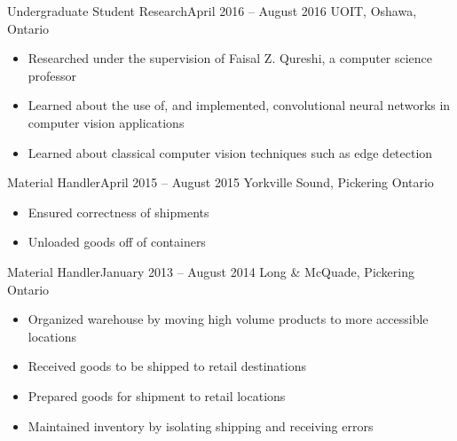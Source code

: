 \documentclass[]{article}
\makeatletter
\newenvironment{*subsection}[2]
{
\begin{tabu} to \linewidth {@{}X[l] r}
  \textbf{#1} &
  \textbf{#2}
\end{tabu}
}
{
  \vspace{3mm}
}
\makeatother
\begin{document}
%
\begin{*subsection}{Undergraduate Student Research}{April 2016 -- August 2016}
%
UOIT, Oshawa, Ontario
%
\begin{itemize}
\item
  Researched under the supervision of Faisal Z. Qureshi, a computer
  science professor
\item
  Learned about the use of, and implemented, convolutional neural networks in computer
  vision applications
\item
  Learned about classical computer vision techniques such as edge detection
\end{itemize}
\end{*subsection}
\begin{*subsection}{Material Handler}{April 2015 -- August 2015}
%
Yorkville Sound, Pickering Ontario
%
\begin{itemize}
\item
  Ensured correctness of shipments
\item
  Unloaded goods off of containers
\end{itemize}
\end{*subsection}
\begin{*subsection}{Material Handler}{January 2013 -- August 2014}
%
Long \& McQuade, Pickering Ontario
%
\begin{itemize}
\item
  Organized warehouse by moving high volume products to more
  accessible locations
\item
  Received goods to be shipped to retail destinations
\item
  Prepared goods for shipment to retail locations
\item
  Maintained inventory by isolating shipping and receiving errors
\end{itemize}
\end{*subsection}
\end{document}
